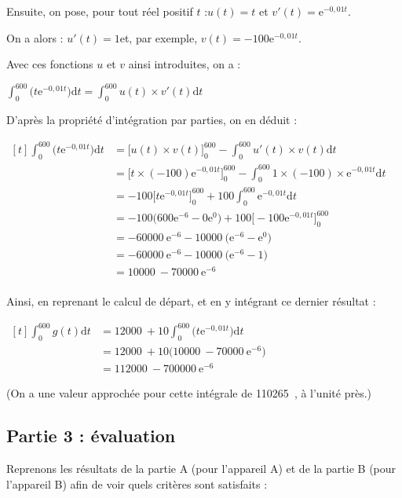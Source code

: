 \documentclass[10pt]{article}
\providecommand{\e}{{\mathrm{e}}}
\providecommand{\np}[2][]{{#2~#1}}
\renewcommand{\d}{{\mathrm{d}}}
\begin{document}
\begin{enumerate}
Ensuite, on pose, pour tout réel positif $t$ :\quad $u(t) = t$ \quad et \quad $v'(t) = \e^{-0,01t}$.

On a alors : \quad $u'(t) = 1$\quad et, par exemple, \quad $v(t) = -100\e^{-0,01t}$.

Avec ces fonctions $u$ et $v$ ainsi introduites, on a :

$\displaystyle \int_{0}^{600} \big(t\e^{-0,01t}\big) \d t = \int_{0}^{600} u(t)\times v'(t) \d t$

D'après la propriété d'intégration par parties, on en déduit :

	$\begin{aligned}[t] \displaystyle \int_{0}^{600} \big(t\e^{-0,01t}\big) \d t
	&= \Big[u(t)\times v(t) \Big]_0^{600} - \int_{0}^{600} u'(t)\times v(t) \d t\\
	&= \Big[t\times (-100)\e^{-0,01t} \Big]_0^{600} - \int_{0}^{600} 1\times( -100)\times \e^{-0,01t} \d t\\
	&= -100 \Big[t\e^{-0,01t} \Big]_0^{600} +100 \int_{0}^{600} \e^{-0,01t} \d t\\
	&= -100 \Big(600\e^{-6} - 0\e^{0}\Big) + 100 \Big[-100\e^{-0,01t}\Big]_{0}^{600}\\
	&= -\np{60000}\e^{-6} - \np{10000} \Big(\e^{-6} - \e^{0}\Big)\\
	&= -\np{60000}\e^{-6} - \np{10000} \Big(\e^{-6} - 1\Big)\\
	&= \np{10000}-\np{70000}\e^{-6}\\
	\end{aligned}$

Ainsi, en reprenant le calcul de départ, et en y intégrant ce dernier résultat :

$\begin{aligned}[t] \displaystyle \int_{0}^{600} g(t) \d t
&= \np{12000} + 10 \int_{0}^{600} \big(t\e^{-0,01t}\big) \d t\\
&= \np{12000} + 10\Big(\np{10000}-\np{70000}\e^{-6}\Big)\\
&=\np{112000} - \np{700000}\e^{-6}	\end{aligned}$

(On a une valeur approchée pour cette intégrale de \np{110265}, à l'unité près.)
\end{enumerate}

\subsection*{Partie 3 : évaluation}

Reprenons les résultats de la partie A (pour l'appareil A) et de la partie B (pour l'appareil B) afin de voir quels critères sont satisfaits :
\end{document}
